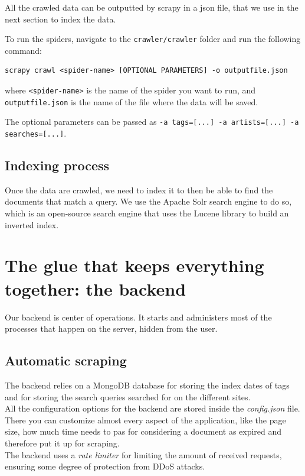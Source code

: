 \documentclass[tikz,14pt]{article}
\begin{document}
All the crawled data can be outputted by scrapy in a json file, that we use in the next section to index the data.

To run the spiders, navigate to the \texttt{crawler/crawler} folder and run the following command:
\begin{verbatim}
scrapy crawl <spider-name> [OPTIONAL PARAMETERS] -o outputfile.json
\end{verbatim}
where \texttt{<spider-name>} is the name of the spider you want to run,
and \texttt{outputfile.json} is the name of the file where the data will be saved.

The optional parameters can be passed as \texttt{-a tags=[...] -a artists=[...] -a searches=[...]}.



\subsection{Indexing process} \label{sec:indexing}
Once the data are crawled, we need to index it to then be able to find the documents that match a query.
We use the Apache Solr search engine to do so, which is an open-source search engine that uses the Lucene library to build an inverted index.
 
\section{The glue that keeps everything together: the backend} \label{sec:backend}
Our backend is center of operations. It starts and administers most of the processes that happen on the server, hidden from the user.

\subsection{Automatic scraping} \label{sec:scraping}
The backend relies on a MongoDB database for storing the index dates of tags and for storing the search queries searched for on the different sites.\\
All the configuration options for the backend are stored inside the \textit{config.json} file. There you can customize almost every aspect of the application, like the page size, how much time needs to pas for considering a document as expired and therefore put it up for scraping.\\

The backend uses a \textit{rate limiter} for limiting the amount of received requests, ensuring some degree of protection from DDoS attacks.
\end{document}
